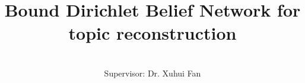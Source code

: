 \title{Bound Dirichlet Belief Network for topic reconstruction}


\author{\Authornameonly\\{\bigskip}Supervisor: Dr. Xuhui Fan}

\copyrightfalse
\figurespagefalse
\tablespagefalse
